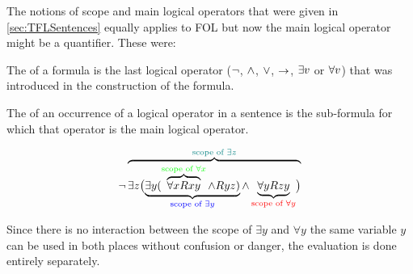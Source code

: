 
 The notions of scope and main logical operators that were given in \cref{sec:TFLSentences} equally applies to FOL but now the main logical operator might be a quantifier. These were:
	\begin{definition}
The  of a formula is the last logical operator ($\neg$, $\mathbin{\wedge}$, $\vee$, $\rightarrow$, $\exists v$ or $\forall v$) that was introduced in the construction of the formula.

\bigskip

		The  of an occurrence of a logical operator in a sentence is the sub-formula for which that operator is the main logical operator.
	\end{definition}
	




\[
\neg \overbrace{\exists z\bigl(\underbrace{\exists y(\overbrace{\forall x Rxy}^{\textcolor{green}{\text{scope of }\forall x}}\mathbin{\wedge} Ryz)}_{\textcolor{blue}{\text{scope of }\exists y}}\mathbin{\wedge} \underbrace{\forall y Rzy}_{\textcolor{red}{\text{scope of }\forall y}}\bigr)}^{\textcolor{teal}{\text{scope of }\exists z}}
\]

Since there is no interaction between the scope of $\exists y$ and $\forall y$ the same variable $y$ can be used in both places without confusion or danger, the evaluation is done entirely separately. 



